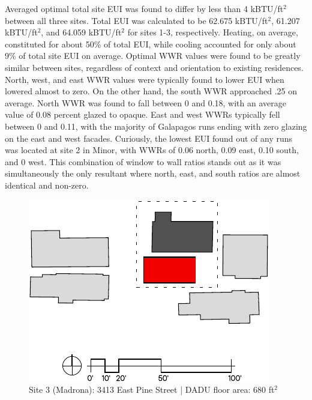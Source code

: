 \documentclass[sagev,times,Review,doublespace]{sagej}
\begin{document}
Averaged optimal total site EUI was found to differ by less than 4 kBTU/ft$^2$ between all three sites. Total EUI was calculated to be 62.675 kBTU/ft$^2$, 61.207 kBTU/ft$^2$, and 64.059 kBTU/ft$^2$ for sites 1-3, respectively. Heating, on average, constituted for about 50\% of total EUI, while cooling accounted for only about 9\% of total site EUI on average. Optimal WWR values were found to be greatly similar between sites, regardless of context and orientation to existing residences. North, west, and east WWR values were typically found to lower EUI when lowered almost to zero. On the other hand, the south WWR approached .25 on average. North WWR was found to fall between 0 and 0.18, with an average value of 0.08 percent glazed to opaque. East and west WWRs typically fell between 0 and 0.11, with the majority of Galapagos runs ending with zero glazing on the east and west facades. Curiously, the lowest EUI found out of any runs was located at site 2 in Minor, with WWRs of 0.06 north, 0.09 east, 0.10 south, and 0 west. This combination of window to wall ratios stands out as it was simultaneously the only resultant where north, east, and south ratios are almost identical and non-zero.

\begin{figure}[h!]
\centering
\includegraphics{site3.pdf}
\caption{Site 3 (Madrona): 3413 East Pine Street | DADU floor area: 680 ft$^2$}
\label{site3-plan}
\end{figure}
\end{document}
